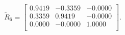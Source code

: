 \begin{equation*}
\widetilde{R}_{6} = 
\begin{bmatrix}
  0.9419 &  -0.3359 &  -0.0000 \\
  0.3359 &   0.9419 &  -0.0000 \\
  0.0000 &  -0.0000 &   1.0000 \\
\end{bmatrix}.
\end{equation*}
